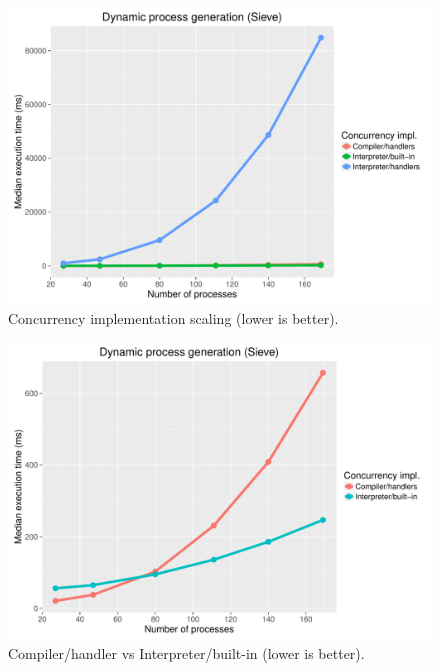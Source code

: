 \documentclass[12pt,mscres,cdtppar,twoside,openright,logo,rightchapter,normalheadings]{infthesis}
\theoremstyle{definition}
\begin{document}
\begin{figure}[H]
\centering
\includegraphics[scale=0.55]{plots/sieve.pdf}
\caption{Concurrency implementation scaling (lower is better).}\label{fig:sieve-plot}
\end{figure}

\begin{figure}
\centering
\includegraphics[scale=0.55]{plots/sieve_compiler-interpreter.pdf}
\caption{Compiler/handler vs Interpreter/built-in (lower is better).}\label{fig:sieve-handler-interpreter-plot}
\end{figure}
\end{document}
